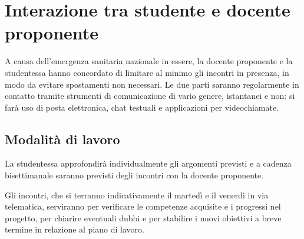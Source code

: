 
\section{Interazione tra studente e docente proponente}
A causa dell'emergenza sanitaria nazionale in essere, la docente proponente e la studentessa hanno concordato di limitare al minimo gli incontri in presenza, in modo da evitare spostamenti non necessari. Le due parti saranno regolarmente in contatto tramite strumenti di comunicazione di vario genere, istantanei e non: si farà uso di posta elettronica, chat testuali e applicazioni per videochiamate.

\subsection{Modalità di lavoro}
La studentessa approfondirà individualmente gli argomenti previsti e a cadenza bisettimanale saranno previsti degli incontri con la docente proponente.

Gli incontri, che si terranno indicativamente il martedì e il venerdì in via telematica, serviranno per verificare le competenze acquisite e i progressi nel progetto, per chiarire eventuali dubbi e per stabilire i nuovi obiettivi a breve termine in relazione al piano di lavoro.
